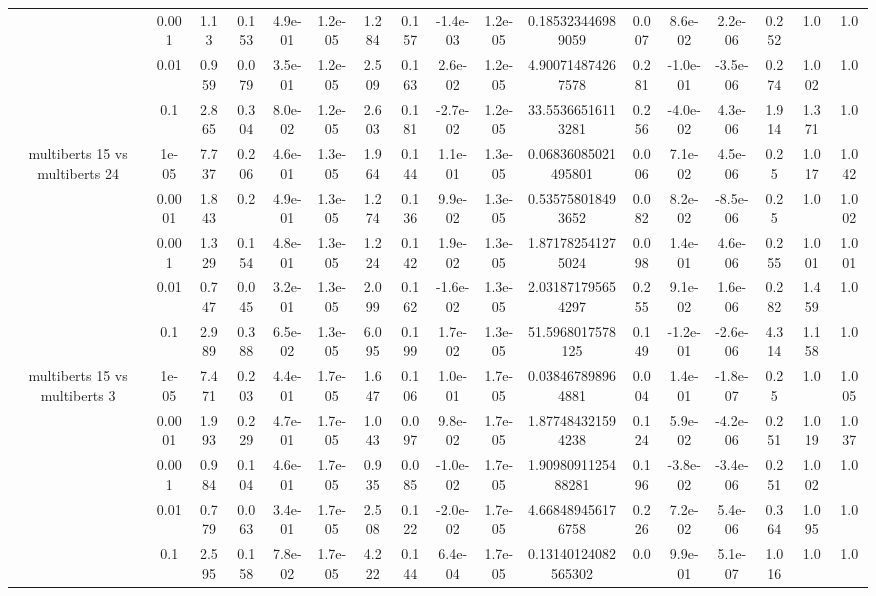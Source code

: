 \begin{tabular}{|c|c|c|c|c|c|c|c|c|c|c|c|c|c|c|c|c|}
 & 0.001 & 1.13 & 0.153 & 4.9e-01 & 1.2e-05 & 1.284 & 0.157 & -1.4e-03 & 1.2e-05 & 0.185323446989059 & 0.007 & 8.6e-02 & 2.2e-06 & 0.252 & 1.0 & 1.0 \\
 & 0.01 & 0.959 & 0.079 & 3.5e-01 & 1.2e-05 & 2.509 & 0.163 & 2.6e-02 & 1.2e-05 & 4.900714874267578 & 0.281 & -1.0e-01 & -3.5e-06 & 0.274 & 1.002 & 1.0 \\
 & 0.1 & 2.865 & 0.304 & 8.0e-02 & 1.2e-05 & 2.603 & 0.181 & -2.7e-02 & 1.2e-05 & 33.55366516113281 & 0.256 & -4.0e-02 & 4.3e-06 & 1.914 & 1.371 & 1.0 \\
\hline
\multirow{5}{*}{multiberts 15 vs multiberts 24} & 1e-05 & 7.737 & 0.206 & 4.6e-01 & 1.3e-05 & 1.964 & 0.144 & 1.1e-01 & 1.3e-05 & 0.06836085021495801 & 0.006 & 7.1e-02 & 4.5e-06 & 0.25 & 1.017 & 1.042 \\
 & 0.0001 & 1.843 & 0.2 & 4.9e-01 & 1.3e-05 & 1.274 & 0.136 & 9.9e-02 & 1.3e-05 & 0.535758018493652 & 0.082 & 8.2e-02 & -8.5e-06 & 0.25 & 1.0 & 1.002 \\
 & 0.001 & 1.329 & 0.154 & 4.8e-01 & 1.3e-05 & 1.224 & 0.142 & 1.9e-02 & 1.3e-05 & 1.871782541275024 & 0.098 & 1.4e-01 & 4.6e-06 & 0.255 & 1.001 & 1.001 \\
 & 0.01 & 0.747 & 0.045 & 3.2e-01 & 1.3e-05 & 2.099 & 0.162 & -1.6e-02 & 1.3e-05 & 2.031871795654297 & 0.255 & 9.1e-02 & 1.6e-06 & 0.282 & 1.459 & 1.0 \\
 & 0.1 & 2.989 & 0.388 & 6.5e-02 & 1.3e-05 & 6.095 & 0.199 & 1.7e-02 & 1.3e-05 & 51.5968017578125 & 0.149 & -1.2e-01 & -2.6e-06 & 4.314 & 1.158 & 1.0 \\
\hline
\multirow{5}{*}{multiberts 15 vs multiberts 3} & 1e-05 & 7.471 & 0.203 & 4.4e-01 & 1.7e-05 & 1.647 & 0.106 & 1.0e-01 & 1.7e-05 & 0.038467898964881 & 0.004 & 1.4e-01 & -1.8e-07 & 0.25 & 1.0 & 1.005 \\
 & 0.0001 & 1.993 & 0.229 & 4.7e-01 & 1.7e-05 & 1.043 & 0.097 & 9.8e-02 & 1.7e-05 & 1.877484321594238 & 0.124 & 5.9e-02 & -4.2e-06 & 0.251 & 1.019 & 1.037 \\
 & 0.001 & 0.984 & 0.104 & 4.6e-01 & 1.7e-05 & 0.935 & 0.085 & -1.0e-02 & 1.7e-05 & 1.9098091125488281 & 0.196 & -3.8e-02 & -3.4e-06 & 0.251 & 1.002 & 1.0 \\
 & 0.01 & 0.779 & 0.063 & 3.4e-01 & 1.7e-05 & 2.508 & 0.122 & -2.0e-02 & 1.7e-05 & 4.668489456176758 & 0.226 & 7.2e-02 & 5.4e-06 & 0.364 & 1.095 & 1.0 \\
 & 0.1 & 2.595 & 0.158 & 7.8e-02 & 1.7e-05 & 4.222 & 0.144 & 6.4e-04 & 1.7e-05 & 0.13140124082565302 & 0.0 & 9.9e-01 & 5.1e-07 & 1.016 & 1.0 & 1.0 \\

\end{tabular}

